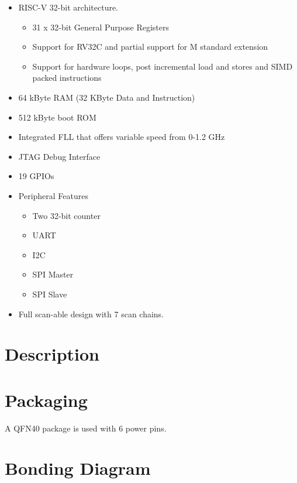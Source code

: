 \begin{itemize}
  \item RISC-V 32-bit architecture.
  \begin{itemize}
    \item 31 x 32-bit General Purpose Registers
    \item Support for RV32C and partial support for M standard extension
    \item Support for hardware loops, post incremental load and stores and SIMD packed instructions
  \end{itemize}
  \item 64 kByte RAM (32 KByte Data and Instruction)
  \item 512 kByte boot ROM
  \item Integrated FLL that offers variable speed from 0-1.2 GHz
  \item JTAG Debug Interface
  \item 19 GPIOs
  \item Peripheral Features
    \begin{itemize}
      \item Two 32-bit counter
      \item UART
      \item I2C
      \item SPI Master
      \item SPI Slave
    \end{itemize}
  \item Full scan-able design with 7 scan chains.
\end{itemize}



\section{Description}


\section{Packaging}

A QFN40 package is used with 6 power pins.

\section{Bonding Diagram}

